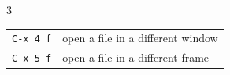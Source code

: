 \documentclass[11pt,landscape,a4paper]{article}
\begin{document}
\begin{multicols}{3}
\begin{tabular}{@{}ll@{}}
{\verb|C-x 4 f|}	& open a file in a different window\\
{\verb|C-x 5 f|}	& open a file in a different frame\\
\end{tabular}

%
%
%
%

\end{multicols}
\end{document}
